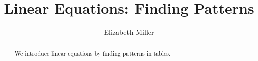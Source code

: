 \documentclass[nooutcomes]{ximera}
\author{Elizabeth Miller}
\title{Linear Equations: Finding Patterns}
\begin{document}
\begin{abstract}
  We introduce linear equations by finding patterns in tables.
\end{abstract}
\licenseORCCA
\maketitle




\end{document}
